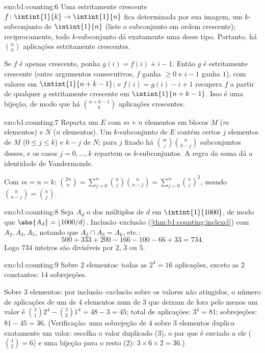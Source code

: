 \begin{solution}{exo:b1:counting:6}
Uma  estritamente crescente $f \colon \intint{1}{k} \to \intint{1}{n}$
fica determinada por sua imagem, um $k$-subconjunto de $\intint{1}{n}$ (liste o
subconjunto em ordem crescente); reciprocamente, todo $k$-subconjunto dá
exatamente uma  desse tipo. Portanto, há $\binom nk$ aplicações
estritamente crescentes.

Se $f$ é apenas crescente, ponha $g(i) = f(i) + i - 1$. Então $g$ é
estritamente crescente (entre argumentos consecutivos, $f$ ganha $\geq 0$
e $i - 1$ ganha $1$), com valores em $\intint{1}{n + k - 1}$; e
$f(i) = g(i) - i + 1$ recupera $f$ a partir de qualquer $g$ estritamente
crescente em $\intint{1}{n+k-1}$. Isso é uma bijeção, de modo que há
$\binom{n + k - 1}{k}$ aplicações crescentes.
\end{solution}

\begin{solution}{exo:b1:counting:7}
Reparta um  $E$ com $m + n$ elementos em blocos $M$ ($m$
elementos) e $N$ ($n$ elementos). Um $k$-subconjunto de $E$ contém certos
$j$ elementos de $M$ ($0 \leq j \leq k$) e $k - j$ de $N$; para $j$ fixado há
$\binom mj \binom{n}{k-j}$ subconjuntos desses, e os casos $j = 0, \dots,
k$ repartem os $k$-subconjuntos. A regra da soma dá a
identidade de Vandermonde.

Com $m = n = k$: $\binom{2n}{n} = \sum_{j=0}^{n} \binom nj
\binom{n}{n-j} = \sum_{j=0}^{n} \binom nj^2$, usando $\binom{n}{n-j} =
\binom nj$.
\end{solution}

\begin{solution}{exo:b1:counting:8}
Seja $A_d$ o  dos múltiplos de $d$ em $\intint{1}{1000}$, de modo que
$\abs{A_d} = \lfloor 1000/d \rfloor$. Inclusão--exclusão
(\cref{thm:b1:counting:inclexcl}) com $A_2, A_3, A_5$, notando que
$A_2 \cap A_3 = A_6$, etc.:
\[
500 + 333 + 200 - 166 - 100 - 66 + 33 = 734 .
\]
Logo $734$ inteiros são divisíveis por $2$, $3$ ou $5$.
\end{solution}

\begin{solution}{exo:b1:counting:9}
Sobre $2$ elementos: todas as $2^4 = 16$ aplicações, exceto as $2$
constantes: $14$ sobrejeções.

Sobre $3$ elementos: por inclusão--exclusão sobre os valores não
atingidos, o número de aplicações de um  de $4$ elementos num de
$3$ que deixam de fora pelo menos um valor é $\binom 31 2^4 - \binom 32 1^4 = 48 - 3 = 45$; total de aplicações: $3^4 =
81$;
sobrejeções: $81 - 45 = 36$. (Verificação: uma sobrejeção de $4$ sobre
$3$ elementos duplica exatamente um valor: escolha o valor duplicado
($3$), o par que é enviado a ele ($\binom 42 = 6$) e uma bijeção para
o resto ($2$): $3 \times 6 \times 2 = 36$.)
\end{solution}

